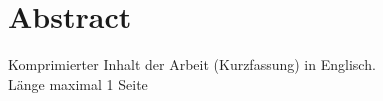 
\chapter{Abstract}

Komprimierter Inhalt der Arbeit (Kurzfassung) in Englisch.\\
Länge maximal 1 Seite


